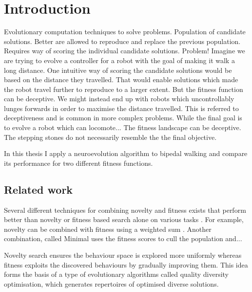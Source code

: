 \section{Introduction}



\label{sec:intro}

Evolutionary computation techniques to solve problems. Population of candidate solutions. Better are allowed to reproduce
and replace the previous population. Requires way of scoring the individual candidate solutions. Problem! Imagine we are
trying to evolve a controller for a robot with the goal of making it walk a long distance. One intuitive way of scoring the
candidate solutions would be based on the distance they travelled. That would enable solutions which made the robot travel
further to reproduce to a larger extent. But the fitness function can be deceptive. We might instead end up with robots which
uncontrollably lunges forwards in order to maximise the distance travelled. This is referred to deceptiveness and is common in more
complex problems. While the final goal is to evolve a robot which can locomote... The fitness landscape can be deceptive.
The stepping stones do not necessarily resemble the the final objective.

In this thesis I apply a neuroevolution algorithm to bipedal walking and compare its performance for two different fitness functions.

\todo{}


\subsection{Related work}
Several different techniques for combining novelty and fitness exists that perform better than novelty or
fitness based search alone on various tasks \cite{ns_study}. For example, novelty can be combined with fitness using a weighted sum \cite{}.
Another combination, called Minimal  uses the fitness scores to cull the population and...

Novelty search ensures the behaviour space is explored more uniformly whereas fitness exploits the discovered behaviours
by gradually improving them. This idea forms the basis of a type of evolutionary algorithms called quality diversity optimisation, which
generates repertoires of optimised diverse solutions.

